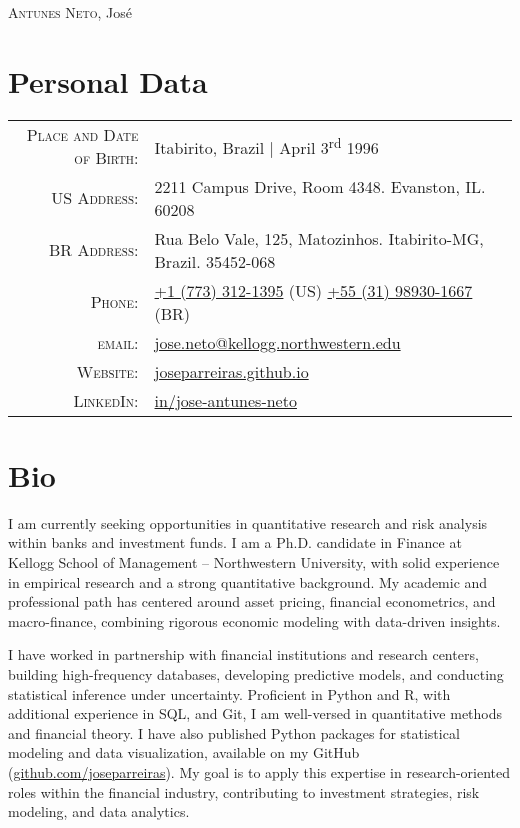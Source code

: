 \documentclass[a4paper,10pt]{article}
\begin{document}
\par{
    \centering
    {\Huge \textsc{Antunes Neto}, José
    }\bigskip\par
}

\section{Personal Data}

\begin{tabular}{rp{10.75cm}}
    \textsc{Place and Date of Birth:} & Itabirito, Brazil  | April 3\textsuperscript{rd}  1996 \\
    \textsc{US Address:}   & 2211 Campus Drive, Room 4348. Evanston, IL. 60208 \\
    \textsc{BR Address:}& Rua Belo Vale, 125, Matozinhos. Itabirito-MG, Brazil. 35452-068  \\
    \textsc{Phone:}     & \href{tel:+17733121395}{+1 (773) 312-1395} (US) \quad \href{tel:+5531989301667}{+55 (31) 98930-1667} (BR) \\
    \textsc{email:}     & \href{mailto:jose.neto@kellogg.northwestern.edu}{jose.neto@kellogg.northwestern.edu} \\
    \textsc{Website:}   & \href{http://joseparreiras.github.io}{joseparreiras.github.io} \\
    \textsc{LinkedIn:}  & \href{https://www.linkedin.com/in/jose-antunes-neto/}{in/jose-antunes-neto}
\end{tabular}

\section{Bio}

\noindent

\small{
I am currently seeking opportunities in quantitative research and risk analysis within banks and investment funds. I am a Ph.D. candidate in Finance at Kellogg School of Management – Northwestern University, with solid experience in empirical research and a strong quantitative background. My academic and professional path has centered around asset pricing, financial econometrics, and macro-finance, combining rigorous economic modeling with data-driven insights.

I have worked in partnership with financial institutions and research centers, building high-frequency databases, developing predictive models, and conducting statistical inference under uncertainty. Proficient in Python and R, with additional experience in SQL, and Git, I am well-versed in quantitative methods and financial theory. I have also published Python packages for statistical modeling and data visualization, available on my GitHub (\href{https://github.com/joseparreiras}{github.com/joseparreiras}). My goal is to apply this expertise in research-oriented roles within the financial industry, contributing to investment strategies, risk modeling, and data analytics.
}
\end{document}
